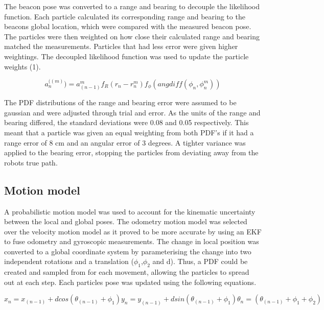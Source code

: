 \documentclass[a4paper,12pt]{article}
\begin{document}
The beacon pose was converted to a range and bearing to decouple the likelihood function. Each particle calculated its corresponding range and bearing to the beacons global location, which were compared with the measured beacon pose. The particles were then weighted on how close their calculated range and bearing matched the measurements. Particles that had less error were given higher weightings. The decoupled likelihood function was used to update the particle weights (1).

\begin{equation}
a_{n}^{((m)} )=a_{(n-1)}^{m} f_{R} (r_{n} - r_{n}^{m} ) f_{\phi} (angdiff(\phi_{n}, \phi_{n}^{m} ))
\end{equation}

The PDF distributions of the range and bearing error were assumed to be gaussian and were adjusted through trial and error. As the units of the range and bearing differed, the standard deviations were 0.08 and 0.05 respectively. This meant that a particle was given an equal weighting from both PDF’s if it had a range error of 8 cm and an angular error of 3 degrees. A tighter variance was applied to the bearing error, stopping the particles from deviating away from the robots true path. 

\subsection{Motion model}

A probabilistic motion model was used to account for the kinematic uncertainty between the local and global poses. The odometry motion model was selected over the velocity motion model as it proved to be more accurate by using an EKF to fuse odometry and gyroscopic measurements. The change in local position was converted to a global coordinate system by parameterising the change into two independent rotations and a translation ($\phi_{1}$,$\phi_{2}$ and d). Thus, a PDF could be created and sampled from for each movement, allowing the particles to spread out at each step. Each particles pose was updated using the following equations.

\begin{subequations}
\begin{equation}
x_n=x_(n-1)+dcos(\theta_(n-1)+\phi_1)
\end{equation}
\begin{equation}
y_n=y_(n-1)+dsin(\theta_(n-1)+\phi_1) 
\end{equation}
\begin{equation}
\theta_n=(\theta_(n-1)+\phi_1+\phi_2)
\end{equation}
\end{subequations}
\end{document}
